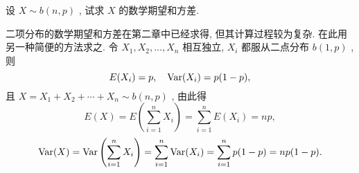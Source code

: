   \begin{example}\label{exam:3.4.5}
  	设 $X \sim b(n,p)$ , 试求 $X$ 的数学期望和方差.
  	\begin{solution}
  		二项分布的数学期望和方差在第二章中已经求得, 但其计算过程较为复杂. 在此用另一种简便的方法求之. 令 $X_1,X_2,\ldots,X_n$ 相互独立, $X_i$ 都服从二点分布 $b(1,p)$ , 则
  		\begin{equation*}
  			E(X_i)=p,\quad \operatorname{Var}(X_i)=p(1-p),
  		\end{equation*}
  		且 $X=X_1+X_2+\cdots+X_n \sim b(n,p)$ , 由此得
  		\begin{equation*}
  			E(X)=E\left( \sum_{i=1}^{n}X_i \right)=\sum_{i=1}^{n}E(X_i)=np,
  		\end{equation*}
  		\begin{equation*}
  			\operatorname{Var}(X)=\operatorname{Var}\left( \sum_{i=1}^{n}X_i \right)=\sum_{i=1}^{n}\operatorname{Var}(X_i)=\sum_{i=1}^{n}p(1-p)=np(1-p).
  		\end{equation*}
  	\end{solution}
  \end{example}

